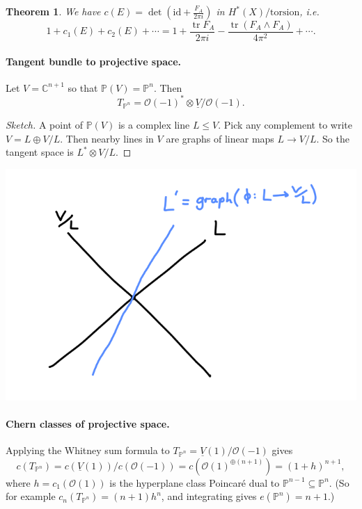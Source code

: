 \documentclass{article}
\newtheorem*{theorem}{Theorem}
\theoremstyle{definition}
\DeclareMathOperator{\tr}{tr}
\newcommand{\id}{\mathrm{id}}
\renewcommand{\O}{\mathcal{O}}
\renewcommand{\P}{\mathbb{P}}
\newcommand{\C}{\mathbb{C}}
\begin{document}
\begin{theorem}
    We have $c(E)=\det(\id+\frac{F_A}{2\pi i})$ in $H^*(X)/\text{torsion}$, i.e.
    \begin{equation*}
        1 + c_1(E) + c_2(E) + \cdots
            = 1 + \frac{\tr F_A}{2\pi i} - \frac{\tr(F_A\wedge F_A)}{4\pi^2}
                + \cdots.
    \end{equation*}
\end{theorem}

\paragraph{Tangent bundle to projective space.}
Let $V=\C^{n+1}$ so that $\P(V)=\P^n$. Then
\begin{equation*}
    T_{\P^n} = \O(-1)^*\otimes\underline V/\O(-1).
\end{equation*}
\begin{proof}[Sketch]
    A point of $\P(V)$ is a complex line $L\le V$. Pick any complement to write
    $V=L\oplus V/L$. Then nearby lines in $V$ are graphs of linear maps
    $L\to V/L$. So the tangent space is $L^*\otimes V/L$.
\end{proof}
\begin{center}
    \includegraphics[scale=0.4]{chern_tangent}
\end{center}

\paragraph{Chern classes of projective space.}
Applying the Whitney sum formula to $T_{\P^n}=\underline V(1)/\O(-1)$ gives
\begin{equation*}
    c(T_{\P^n})
        = c(\underline V(1))/c(\O(-1))
        = c(\O(1)^{\oplus(n+1)})
        = (1+h)^{n+1},
\end{equation*}
where $h=c_1(\O(1))$ is the hyperplane class Poincar\'e dual to
$\P^{n-1}\subseteq\P^n$. (So for example $c_n(T_{\P^n})=(n+1)h^n$, and
integrating gives $e(\P^n)=n+1$.)
\end{document}

